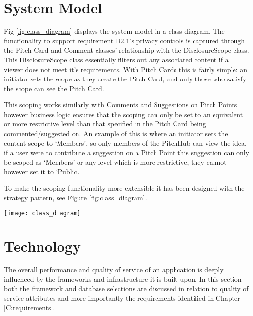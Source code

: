 \section{System Model}\label{S:systemModel}

Fig \ref{fig:class_diagram} displays the system model in a class diagram. The functionality to support requirement D2.1's privacy controls is captured through the Pitch Card and Comment classes' relationship with the DisclosureScope class. This DisclosureScope class essentially filters out any associated content if a viewer does not meet it's requirements. With Pitch Cards this is fairly simple: an initiator sets the scope as they create the Pitch Card, and only those who satisfy the scope can see the Pitch Card.

This scoping works similarly with Comments and Suggestions on Pitch Points however business logic ensures that the  scoping can only be set to an equivalent or more restrictive level than that specified in the Pitch Card being commented/suggested on. An example of this is where an initiator sets the content scope to `Members', so only members of the PitchHub can view the idea, if a user were to contribute a suggestion on a Pitch Point this suggestion can only be scoped as `Members' or any level which is more restrictive, they cannot however set it to `Public'. 

To make the scoping functionality more extensible it has been designed with the strategy pattern, see Figure \ref{fig:class_diagram}.
 
\begin{sidewaysfigure}[ht]
    \centering
    \texttt{[image: class\_diagram]}
    \caption{PitchHub's system structure as represented in a class diagram. Of note is the Pitch Card and Comment classes and their relationship to the DisclosureScopes. This relationship describes the Pitch Card and Comment classes ability to scope the visibility of their content. (NB: some attributes were left out for the sake of brevity e.g. Pitch Cards have an `images' attribute)}
    \label{fig:class_diagram}
\end{sidewaysfigure}

\section{Technology}

The overall performance and quality of service of an application is deeply influenced by the frameworks and infrastructure it is built upon. In this section both the framework and database selections are discussed in relation to quality of service attributes and more importantly the requirements identified in Chapter \ref{C:requirements}.

